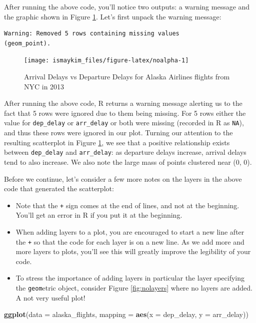 \documentclass[12pt, krantz2,]{krantz}
\makeatletter
\newenvironment{Shaded}{\begin{snugshade}}{\end{snugshade}}
\newcommand{\DataTypeTok}[1]{\textcolor[rgb]{0.27,0.27,0.27}{#1}}
\newcommand{\KeywordTok}[1]{\textcolor[rgb]{0.27,0.27,0.27}{\textbf{#1}}}
\newcommand{\NormalTok}[1]{#1}
\providecommand{\tightlist}{%
  \setlength{\itemsep}{0pt}\setlength{\parskip}{0pt}}
\newenvironment{kframe}{%
\medskip{}
\setlength{\fboxsep}{.8em}
 \def\at@end@of@kframe{}%
 \ifinner\ifhmode%
  \def\at@end@of@kframe{\end{minipage}}%
  \begin{minipage}{\columnwidth}%
 \fi\fi%
 \def\FrameCommand##1{\hskip\@totalleftmargin \hskip-\fboxsep
 \colorbox{shadecolor}{##1}\hskip-\fboxsep
     \hskip-\linewidth \hskip-\@totalleftmargin \hskip\columnwidth}%
 \MakeFramed {\advance\hsize-\width
   \@totalleftmargin\z@ \linewidth\hsize
   \@setminipage}}%
 {\par\unskip\endMakeFramed%
 \at@end@of@kframe}
\renewenvironment{Shaded}{\begin{kframe}}{\end{kframe}}
\makeatother
\begin{document}
After running the above code, you'll notice two outputs: a warning message and the graphic shown in Figure \ref{fig:noalpha}. Let's first unpack the warning message:

\begin{verbatim}
Warning: Removed 5 rows containing missing values
(geom_point).
\end{verbatim}

\begin{figure}

{\centering \texttt{[image: ismaykim\_files/figure-latex/noalpha-1]} 

}

\caption{Arrival Delays vs Departure Delays for Alaska Airlines flights from NYC in 2013}\label{fig:noalpha}
\end{figure}

After running the above code, R returns a warning message alerting us to the fact that 5 rows were ignored due to them being missing. For 5 rows either the value for \texttt{dep\_delay} or \texttt{arr\_delay} or both were missing (recorded in R as \texttt{NA}), and thus these rows were ignored in our plot. Turning our attention to the resulting scatterplot in Figure \ref{fig:noalpha}, we see that a positive relationship exists between \texttt{dep\_delay} and \texttt{arr\_delay}: as departure delays increase, arrival delays tend to also increase. We also note the large mass of points clustered near (0, 0).

Before we continue, let's consider a few more notes on the layers in the above code that generated the scatterplot:

\begin{itemize}
\tightlist
\item
  Note that the \texttt{+} sign comes at the end of lines, and not at the beginning. You'll get an error in R if you put it at the beginning.
\item
  When adding layers to a plot, you are encouraged to start a new line after the \texttt{+} so that the code for each layer is on a new line. As we add more and more layers to plots, you'll see this will greatly improve the legibility of your code.
\item
  To stress the importance of adding layers in particular the layer specifying the \texttt{geom}etric object, consider Figure \ref{fig:nolayers} where no layers are added. A not very useful plot!
\end{itemize}

\begin{Shaded}
\begin{Highlighting}[]
\KeywordTok{ggplot}\NormalTok{(}\DataTypeTok{data =}\NormalTok{ alaska_flights, }\DataTypeTok{mapping =} \KeywordTok{aes}\NormalTok{(}\DataTypeTok{x =}\NormalTok{ dep_delay, }\DataTypeTok{y =}\NormalTok{ arr_delay))}
\end{Highlighting}
\end{Shaded}
\end{document}
